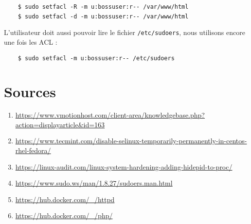 \documentclass{extarticle} %
\begin{document}
    \begin{verbatim}
    $ sudo setfacl -R -m u:bossuser:r-- /var/www/html
    $ sudo setfacl -d -m u:bossuser:r-- /var/www/html
    \end{verbatim}

    L’utilisateur doit aussi pouvoir lire le fichier \texttt{/etc/sudoers}, nous utilisons encore une fois les ACL :

    \begin{verbatim}
    $ sudo setfacl -m u:bossuser:r-- /etc/sudoers
    \end{verbatim}

    \section{Sources}

    \begin{enumerate}[label=>]
      \item \url{https://www.vmotionhost.com/client-area/knowledgebase.php?action=displayarticle&id=163}
      \item \url{https://www.tecmint.com/disable-selinux-temporarily-permanently-in-centos-rhel-fedora/}
      \item \url{https://linux-audit.com/linux-system-hardening-adding-hidepid-to-proc/}
      \item \url{https://www.sudo.ws/man/1.8.27/sudoers.man.html}
      \item \url{https://hub.docker.com/_/httpd}
      \item \url{https://hub.docker.com/_/php/}
    \end{enumerate}
\end{document}
